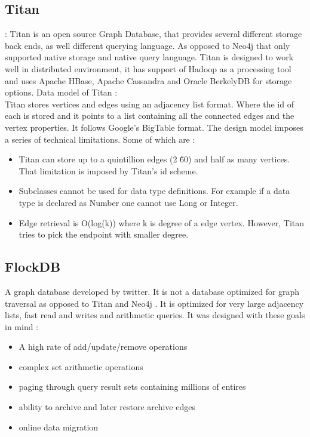 \documentclass[english]{tktltiki}
\begin{document}
\subsection{Titan}: 
Titan is an open source Graph Database, that provides several different storage back ends, as well different querying language. As opposed to Neo4j that only supported native storage and native query language. Titan is designed to work well in distributed environment, it has support of Hadoop as a processing tool and uses Apache HBase, Apache Cassandra and Oracle BerkelyDB for storage options. 
Data model of Titan : \\
Titan stores vertices and edges using an adjacency list format. Where the id of each is stored and it points to a list containing all the connected edges and the vertex properties. It follows Google's BigTable format. The design model imposes a series of technical limitations. Some of which are : 
\begin{itemize}
\item 
Titan can store up to a quintillion edges (2 \^ 60) and half as many vertices. That limitation is imposed by Titan's id scheme.
\item
Subclasses cannot be used for data type definitions. For example if a data type is declared as Number one cannot use Long or Integer. 
\item
Edge retrieval is O(log(k)) where k is degree of a edge vertex. However, Titan tries to pick the endpoint with smaller degree.

\end{itemize}

\subsection{FlockDB}
A graph database developed by twitter. It is not a database optimized for graph traversal as opposed to Titan and Neo4j . It is optimized for very large 
adjacency lists, fast read and writes and arithmetic queries. It was designed with these goals in mind :
\begin{itemize}
\item
A high rate of add/update/remove operations
\item
complex set arithmetic operations
\item
paging through query result sets containing millions of entires
\item
ability to archive and later restore archive edges
\item
online data migration
\end{itemize} 
\end{document}
